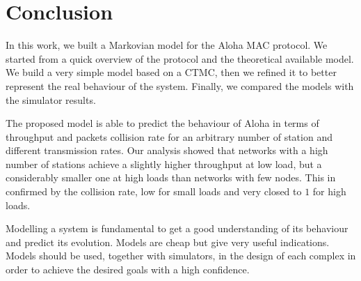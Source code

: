 \section{Conclusion}
\label{sec:conclusion}

In this work, we built a Markovian model for the Aloha \ac{MAC} protocol.
We started from a quick overview of the protocol and the theoretical available model.
We build a very simple model based on a \ac{CTMC}, then we refined it to better represent the real behaviour of the system.
Finally, we compared the models with the simulator results.

The proposed model is able to predict the behaviour of Aloha in terms of throughput and packets collision rate for an arbitrary number of station and different transmission rates.
Our analysis showed that networks with a high number of stations achieve a slightly higher throughput at low load, but a considerably smaller one at high loads than networks with few nodes.
This in confirmed by the collision rate, low for small loads and very closed to $1$ for high loads.

Modelling a system is fundamental to get a good understanding of its behaviour and predict its evolution.
Models are cheap but give very useful indications.
Models should be used, together with simulators, in the design of each complex in order to achieve the desired goals with a high confidence.
